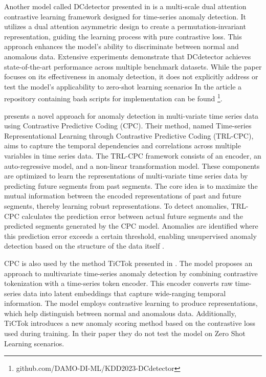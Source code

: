 Another model called DCdetector presented in \cite{yang_dcdetector_2023} is a multi-scale dual attention contrastive learning framework designed for time-series anomaly detection. It utilizes a dual attention asymmetric design to create a permutation-invariant representation, guiding the learning process with pure contrastive loss. This approach enhances the model's ability to discriminate between normal and anomalous data. Extensive experiments demonstrate that DCdetector achieves state-of-the-art performance across multiple benchmark datasets. While the paper focuses on its effectiveness in anomaly detection, it does not explicitly address or test the model's applicability to zero-shot learning scenarios \cite{yang_dcdetector_2023} In the article a repository containing bash scripts for implementation can be found \footnote{\fussy\tiny github.com/DAMO-DI-ML/KDD2023-DCdetector}.

\cite{pranavan_contrastive_2022} presents a novel approach for anomaly detection in multi-variate time series data using Contrastive Predictive Coding (CPC). Their method, named Time-series Representational Learning through Contrastive Predictive Coding (TRL-CPC), aims to capture the temporal dependencies and correlations across multiple variables in time series data.
The TRL-CPC framework consists of an encoder, an auto-regressive model, and a non-linear transformation model. These components are optimized to learn the representations of multi-variate time series data by predicting future segments from past segments. The core idea is to maximize the mutual information between the encoded representations of past and future segments, thereby learning robust representations.
To detect anomalies, TRL-CPC calculates the prediction error between actual future segments and the predicted segments generated by the CPC model. Anomalies are identified where this prediction error exceeds a certain threshold, enabling unsupervised anomaly detection based on the structure of the data itself \cite{pranavan_contrastive_2022}.

CPC is also used by the method TiCTok presented in \cite{kang_tictok_2023}. The model proposes an approach to multivariate time-series anomaly detection by combining contrastive tokenization with a time-series token encoder. This encoder converts raw time-series data into latent embeddings that capture wide-ranging temporal information. The model employs contrastive learning to produce representations, which help distinguish between normal and anomalous data. Additionally, TiCTok introduces a new anomaly scoring method based on the contrastive loss used during training. In their paper they do not test the model on Zero Shot Learning scenarios.

